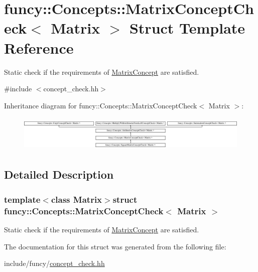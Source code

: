 \hypertarget{structfuncy_1_1Concepts_1_1MatrixConceptCheck}{\section{funcy\-:\-:Concepts\-:\-:Matrix\-Concept\-Check$<$ Matrix $>$ Struct Template Reference}
\label{structfuncy_1_1Concepts_1_1MatrixConceptCheck}
}


Static check if the requirements of \hyperlink{structfuncy_1_1Concepts_1_1MatrixConcept}{Matrix\-Concept} are satisfied.  




{\ttfamily \#include $<$concept\-\_\-check.\-hh$>$}

Inheritance diagram for funcy\-:\-:Concepts\-:\-:Matrix\-Concept\-Check$<$ Matrix $>$\-:\begin{figure}[H]
\begin{center}
\leavevmode
\includegraphics[height=1.724404cm]{structfuncy_1_1Concepts_1_1MatrixConceptCheck}
\end{center}
\end{figure}


\subsection{Detailed Description}
\subsubsection*{template$<$class Matrix$>$struct funcy\-::\-Concepts\-::\-Matrix\-Concept\-Check$<$ Matrix $>$}

Static check if the requirements of \hyperlink{structfuncy_1_1Concepts_1_1MatrixConcept}{Matrix\-Concept} are satisfied. 

The documentation for this struct was generated from the following file\-:\begin{DoxyCompactItemize}
\item 
include/funcy/\hyperlink{concept__check_8hh}{concept\-\_\-check.\-hh}\end{DoxyCompactItemize}

